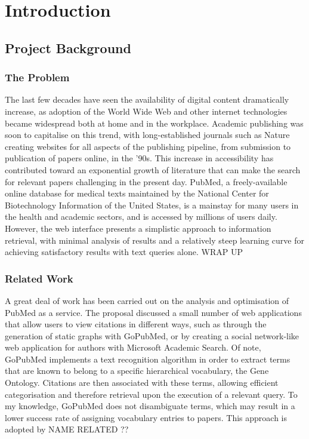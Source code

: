 \documentclass[Report.tex]{subfiles}
\begin{document}
\chapter{Introduction}
\section{Project Background}
\subsection{The Problem}
The last few decades have seen the availability of digital content dramatically increase, as adoption of the World Wide Web and other internet technologies became widespread both at home and in the workplace. Academic publishing was soon to capitalise on this trend, with long-established journals such as Nature creating websites for all aspects of the publishing pipeline, from submission to publication of papers online, in the '90s\cite{nature-history}. This increase in accessibility has contributed toward an exponential growth of literature\cite{hunter-cohen} that can make the search for relevant papers challenging in the present day. PubMed, a freely-available online database for medical texts maintained by the National Center for Biotechnology Information of the United States, is a mainstay for many users in the health and academic sectors, and is accessed by millions of users daily\cite{dogan}. However, the web interface presents a simplistic approach to information retrieval, with minimal analysis of results and a relatively steep learning curve for achieving satisfactory results with text queries alone. WRAP UP

\subsection{Related Work}
A great deal of work has been carried out on the analysis and optimisation of PubMed as a service. The proposal discussed a small number of web applications that allow users to view citations in different ways, such as through the generation of static graphs with GoPubMed\cite{gopubmed}, or by creating a social network-like web application for authors with Microsoft Academic Search\cite{mas}. Of note, GoPubMed implements a text recognition algorithm in order to extract terms that are known to belong to a specific hierarchical vocabulary, the Gene Ontology. Citations are then associated with these terms, allowing efficient categorisation and therefore retrieval upon the execution of a relevant query. To my knowledge, GoPubMed does not disambiguate terms, which may result in a lower success rate of assigning vocabulary entries to papers. This approach is adopted by NAME RELATED ??
\end{document}
